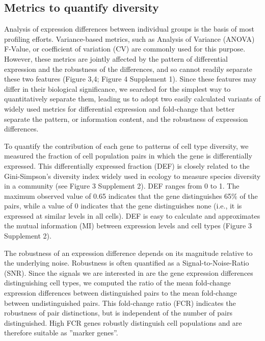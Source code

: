 \subsection{Metrics to quantify diversity}
Analysis of expression differences between individual groups is the basis of most profiling efforts. Variance-based metrics, such as Analysis of Variance (ANOVA) F-Value, or coefficient of variation (CV) are commonly used for this purpose. However, these metrics are jointly affected by the pattern of differential expression and the robustness of the differences, and so cannot readily separate these two features (Figure 3,4; Figure 4 Supplement 1). Since these features may differ in their biological significance, we searched for the simplest way to quantitatively separate them, leading us to adopt two easily calculated variants of widely used metrics for differential expression and fold-change that better separate the pattern, or information content, and the robustness of expression differences.

To quantify the contribution of each gene to patterns of cell type diversity, we measured the fraction of cell population pairs in which the gene is differentially expressed. This differentially expressed fraction (DEF) is closely related to the Gini-Simpson's diversity index \citep{Simpson_1949} widely used in ecology to measure species diversity in a community (see Figure 3 Supplement 2). DEF ranges from 0 to 1. The maximum observed value of 0.65 indicates that the gene distinguishes 65\% of the pairs, while a value of 0 indicates that the gene distinguishes none (i.e., it is expressed at similar levels in all cells). DEF is easy to calculate and approximates the mutual information (MI) between expression levels and cell types (Figure 3 Supplement 2). 

The robustness of an expression difference depends on its magnitude relative to the underlying noise. Robustness is often quantified as a Signal-to-Noise-Ratio (SNR). Since the signals we are interested in are the gene expression differences distinguishing cell types, we computed the ratio of the mean fold-change expression differences between distinguished pairs to the mean fold-change between undistinguished pairs. This fold-change ratio (FCR) indicates the robustness of pair distinctions, but is independent of the number of pairs distinguished. High FCR genes robustly distinguish cell populations and are therefore suitable as ”marker genes”. %

